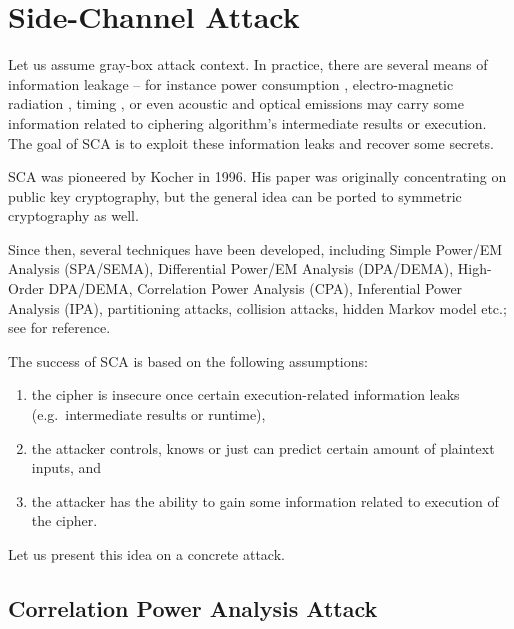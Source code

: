 \section{Side-Channel Attack}
\label{sec:side}

Let us assume gray-box attack context. In practice, there are several means of information leakage -- for instance power consumption \cite{kocher1999differential}, electro-magnetic radiation \cite{agrawal2002side,gandolfi2001electromagnetic,quisquater2001electromagnetic}, timing \cite{kocher1996timing}, or even acoustic \cite{asonov2004keyboard} and optical \cite{kuhn2002optical,loughry2002information} emissions may carry some information related to ciphering algorithm's intermediate results or execution. The goal of SCA is to exploit these information leaks and recover some secrets.

SCA was pioneered by Kocher \cite{kocher1996timing} in 1996. His paper was originally concentrating on public key cryptography, but the general idea can be ported to symmetric cryptography as well.

Since then, several techniques have been developed, including Simple Power/EM Analysis (SPA/SEMA), Differential Power/EM Analysis (DPA/DEMA), High-Order DPA/DEMA, Correlation Power Analysis (CPA), Inferential Power Analysis (IPA), partitioning attacks, collision attacks, hidden Markov model etc.; see \cite[Chapters~13-14]{koc2008cryptographic} for reference.

The success of SCA is based on the following assumptions:
\begin{enumerate}
	\item the cipher is insecure once certain execution-related information leaks (e.g.\ intermediate results or runtime),
	\item the attacker controls, knows or just can predict certain amount of plaintext inputs, and
	\item the attacker has the ability to gain some information related to execution of the cipher.
\end{enumerate}
Let us present this idea on a concrete attack.



\subsection{Correlation Power Analysis Attack}

